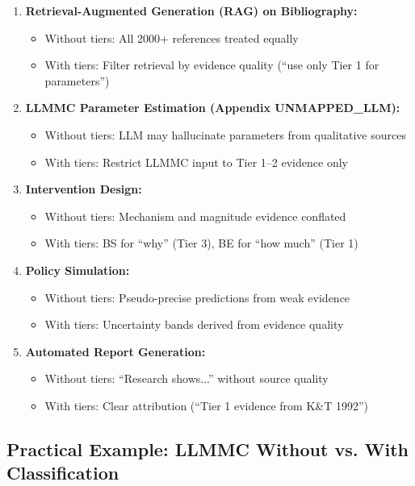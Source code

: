 \documentclass[11pt, a4paper]{article}
\begin{document}
\begin{enumerate}
\item \textbf{Retrieval-Augmented Generation (RAG) on Bibliography:}
\begin{itemize}[nosep]
    \item Without tiers: All 2000+ references treated equally
    \item With tiers: Filter retrieval by evidence quality (``use only Tier 1 for parameters'')
\end{itemize}

\item \textbf{LLMMC Parameter Estimation (Appendix UNMAPPED_LLM):}
\begin{itemize}[nosep]
    \item Without tiers: LLM may hallucinate parameters from qualitative sources
    \item With tiers: Restrict LLMMC input to Tier 1--2 evidence only
\end{itemize}

\item \textbf{Intervention Design:}
\begin{itemize}[nosep]
    \item Without tiers: Mechanism and magnitude evidence conflated
    \item With tiers: BS for ``why'' (Tier 3), BE for ``how much'' (Tier 1)
\end{itemize}

\item \textbf{Policy Simulation:}
\begin{itemize}[nosep]
    \item Without tiers: Pseudo-precise predictions from weak evidence
    \item With tiers: Uncertainty bands derived from evidence quality
\end{itemize}

\item \textbf{Automated Report Generation:}
\begin{itemize}[nosep]
    \item Without tiers: ``Research shows...'' without source quality
    \item With tiers: Clear attribution (``Tier 1 evidence from K\&T 1992'')
\end{itemize}
\end{enumerate}

\subsection{Practical Example: LLMMC Without vs. With Classification}
\end{document}
